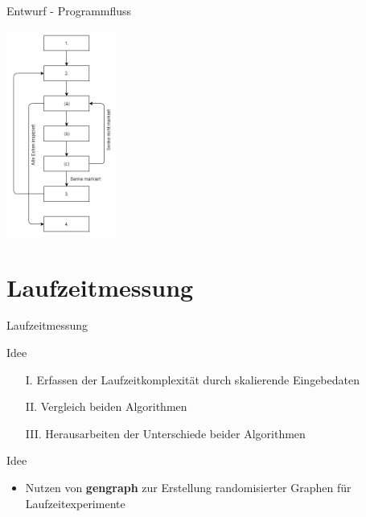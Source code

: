 \documentclass{beamer}
\begin{document}
    \begin{frame}{Entwurf - Programmfluss}
        \begin{center}
            \includegraphics[width=3.6cm]{../fordfulkerson.PNG}
        \end{center}
    \end{frame}

    \section{Laufzeitmessung}
    \begin{frame}{Laufzeitmessung}
        \begin{block}{Idee}
            \begin{itemize}
                \item[I.] Erfassen der Laufzeitkomplexit\"at durch skalierende Eingebedaten
                \item[II.] Vergleich beiden Algorithmen
                \item[III.] Herausarbeiten der Unterschiede beider Algorithmen
            \end{itemize}
        \end{block}

        \begin{block}{Idee}
            \begin{itemize}
                \item Nutzen von \textbf{gengraph} zur Erstellung randomisierter Graphen f\"ur Laufzeitexperimente
            \end{itemize}
        \end{block}
    \end{frame}
\end{document}
